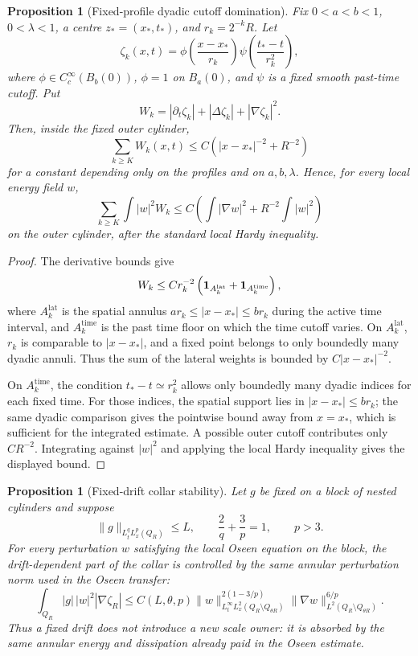 \documentclass[11pt]{article}
\newtheorem{proposition}[theorem]{Proposition}
\begin{document}
\begin{proposition}[Fixed-profile dyadic cutoff domination]
Fix \(0<a<b<1\), \(0<\lambda<1\), a centre \(z_*=(x_*,t_*)\), and
\(r_k=2^{-k}R\).  Let
\[
\zeta_k(x,t)
=
\phi\!\left(\frac{x-x_*}{r_k}\right)
\psi\!\left(\frac{t_*-t}{r_k^2}\right),
\]
where \(\phi\in C_c^\infty(B_b(0))\), \(\phi=1\) on \(B_a(0)\), and \(\psi\)
is a fixed smooth past-time cutoff.  Put
\[
W_k
=
|\partial_t\zeta_k|+|\Delta\zeta_k|+|\nabla\zeta_k|^2 .
\]
Then, inside the fixed outer cylinder,
\[
\sum_{k\ge K} W_k(x,t)
\le
C\left(|x-x_*|^{-2}+R^{-2}\right)
\]
for a constant depending only on the profiles and on \(a,b,\lambda\).  Hence, for
every local energy field \(w\),
\[
\sum_{k\ge K}\int |w|^2 W_k
\le
C
\left(
\int |\nabla w|^2
+R^{-2}\int |w|^2
\right)
\]
on the outer cylinder, after the standard local Hardy inequality.
\end{proposition}

\begin{proof}
The derivative bounds give
\[
W_k\le
C r_k^{-2}
\left(
{\bf 1}_{A_k^{\mathrm{lat}}}
+{\bf 1}_{A_k^{\mathrm{time}}}
\right),
\]
where \(A_k^{\mathrm{lat}}\) is the spatial annulus
\(a r_k\le |x-x_*|\le b r_k\) during the active time interval, and
\(A_k^{\mathrm{time}}\) is the past time floor on which the time cutoff varies.
On \(A_k^{\mathrm{lat}}\), \(r_k\) is comparable to \(|x-x_*|\), and a fixed point
belongs to only boundedly many dyadic annuli.  Thus the sum of the lateral
weights is bounded by \(C|x-x_*|^{-2}\).

On \(A_k^{\mathrm{time}}\), the condition
\(t_*-t\simeq r_k^2\) allows only boundedly many dyadic indices for each fixed
time.  For those indices, the spatial support lies in \(|x-x_*|\le b r_k\);
the same dyadic comparison gives the pointwise bound away from \(x=x_*\), which
is sufficient for the integrated estimate.  A possible outer cutoff contributes
only \(C R^{-2}\).  Integrating against \(|w|^2\) and applying the local Hardy
inequality gives the displayed bound.
\end{proof}

\begin{proposition}[Fixed-drift collar stability]
Let \(g\) be fixed on a block of nested cylinders and suppose
\[
\|g\|_{L^q_tL^p_x(Q_R)}\le L,
\qquad
\frac2q+\frac3p=1,
\qquad
p>3.
\]
For every perturbation \(w\) satisfying the local Oseen equation on the block,
the drift-dependent part of the collar is controlled by the same annular
perturbation norm used in the Oseen transfer:
\[
\int_{Q_R}|g|\,|w|^2|\nabla\zeta_R|
\le
C(L,\theta,p)
\|w\|_{L^\infty_tL^2_x(Q_R\setminus Q_{\theta R})}^{2(1-3/p)}
\|\nabla w\|_{L^2(Q_R\setminus Q_{\theta R})}^{6/p}.
\]
Thus a fixed drift does not introduce a new scale owner: it is absorbed by the
same annular energy and dissipation already paid in the Oseen estimate.
\end{proposition}
\end{document}
